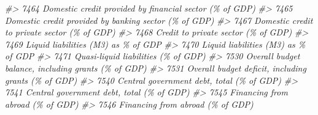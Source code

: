 \documentclass[
]{bxjsbook}
\newenvironment{Shaded}{\begin{snugshade}}{\end{snugshade}}
\newcommand{\CommentTok}[1]{\textcolor[rgb]{0.56,0.35,0.01}{\textit{#1}}}
\theoremstyle{definition}
\theoremstyle{definition}
\theoremstyle{definition}
\theoremstyle{definition}
\theoremstyle{remark}
\begin{document}
\begin{Shaded}
\begin{Highlighting}[]
\CommentTok{\#\textgreater{} 7464                                                                                                                    Domestic credit provided by financial sector (\% of GDP)}
\CommentTok{\#\textgreater{} 7465                                                                                                                      Domestic credit provided by banking sector (\% of GDP)}
\CommentTok{\#\textgreater{} 7467                                                                                                                               Domestic credit to private sector (\% of GDP)}
\CommentTok{\#\textgreater{} 7468                                                                                                                                        Credit to private sector (\% of GDP)}
\CommentTok{\#\textgreater{} 7469                                                                                                                                        Liquid liabilities (M3) as \% of GDP}
\CommentTok{\#\textgreater{} 7470                                                                                                                                        Liquid liabilities (M3) as \% of GDP}
\CommentTok{\#\textgreater{} 7471                                                                                                                                        Quasi{-}liquid liabilities (\% of GDP)}
\CommentTok{\#\textgreater{} 7530                                                                                                                        Overall budget balance, including grants (\% of GDP)}
\CommentTok{\#\textgreater{} 7531                                                                                                                        Overall budget deficit, including grants (\% of GDP)}
\CommentTok{\#\textgreater{} 7540                                                                                                                                  Central government debt, total (\% of GDP)}
\CommentTok{\#\textgreater{} 7541                                                                                                                                  Central government debt, total (\% of GDP)}
\CommentTok{\#\textgreater{} 7545                                                                                                                                           Financing from abroad (\% of GDP)}
\CommentTok{\#\textgreater{} 7546                                                                                                                                           Financing from abroad (\% of GDP)}

\end{Highlighting}
\end{Shaded}
\end{document}
